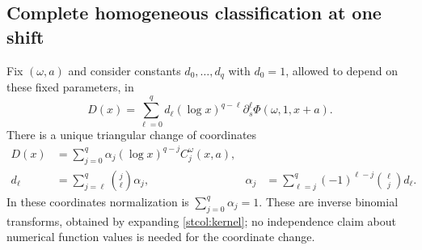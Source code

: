 \subsection{Complete homogeneous classification at one shift}

Fix $(\omega,a)$ and consider constants $d_0,\ldots,d_q$ with $d_0=1$,
allowed to depend on these fixed parameters, in
\begin{equation}\label{stcol:ansatz}
 D(x)=\sum_{\ell=0}^q d_\ell(\log x)^{q-\ell}
                  \partial_s^\ell\Phi(\omega,1,x+a).
\end{equation}
There is a unique triangular change of coordinates
\begin{align}
 D(x)&=\sum_{j=0}^q\alpha_j(\log x)^{q-j}C_j^\omega(x,a),
       \label{stcol:alpha}\\
 d_\ell&=\sum_{j=\ell}^q\binom j\ell\alpha_j,
 &\alpha_j&=\sum_{\ell=j}^q(-1)^{\ell-j}\binom\ell j d_\ell.
       \label{stcol:coordinates}
\end{align}
In these coordinates normalization is $\sum_{j=0}^q\alpha_j=1$.
These are inverse binomial transforms, obtained by expanding
\eqref{stcol:kernel}; no independence claim about numerical function
values is needed for the coordinate change.

